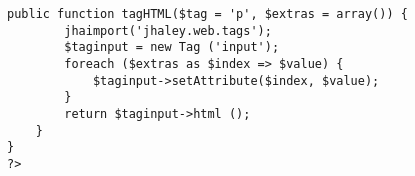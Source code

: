 \begin{lstlisting}[label=jha_renderer_head,caption=Renderizador para el tag HTML `head'.]
    public function tagHTML($tag = 'p', $extras = array()) {
    	jhaimport('jhaley.web.tags');
        $taginput = new Tag ('input');
        foreach ($extras as $index => $value) {
        	$taginput->setAttribute($index, $value);
        }
        return $taginput->html ();
    }
}
?>
\end{lstlisting}
